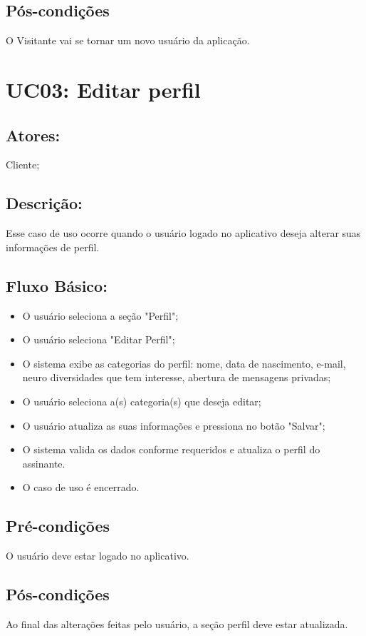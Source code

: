 \subsection{Pós-condições}
O Visitante vai se tornar um novo usuário da aplicação.
\section{UC03: Editar perfil}

\subsection{Atores:}
Cliente;
\subsection{Descrição:}
Esse caso de uso ocorre quando o usuário logado no aplicativo deseja alterar suas informações de perfil. 

\subsection{Fluxo Básico: }
\begin{itemize}
    \item O usuário seleciona a seção "Perfil";
    \item O usuário seleciona "Editar Perfil";
    \item O sistema exibe as categorias do perfil: nome, data de nascimento, e-mail, neuro diversidades que tem interesse, abertura de mensagens privadas;
    \item O usuário seleciona a(s) categoria(s) que deseja editar;
    \item O usuário atualiza as suas informações e pressiona no botão "Salvar";
    \item O sistema valida os dados conforme requeridos e atualiza o perfil do assinante. 
    \item O caso de uso é encerrado. 
\end{itemize}

\subsection{Pré-condições}
O usuário deve estar logado no aplicativo. 
\subsection{Pós-condições}
Ao final das alterações feitas pelo usuário, a seção perfil deve estar atualizada. 

